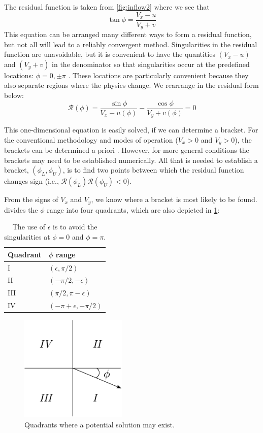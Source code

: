 \documentclass{article}
\begin{document}
The residual function is taken from \cref{fig:inflow2} where we see that
\begin{equation}
\tan\phi = \frac{V_x - u}{V_y  + v}
\end{equation}
This equation can be arranged many different ways to form a residual function, but not all will lead to a reliably convergent method. Singularities in the residual function are unavoidable, but it is convenient to have the quantities $(V_x - u)$ and $(V_y + v)$ in the denominator so that singularities occur at the predefined locations: $\phi = 0, \pm\pi$ \cite{Ning2014b}. These locations are particularly convenient because they also separate regions where the physics change.  We rearrange in the residual form below:
\begin{equation}
    \mathcal{R}(\phi) = \frac{\sin\phi}{V_x - u(\phi)} - \frac{\cos\phi}{V_y + v(\phi)} = 0
    \label{eq:residual}
\end{equation}

This one-dimensional equation is easily solved, if we can determine a bracket.  For the conventional methodology and modes of operation ($V_x > 0$ and $V_y > 0$), the brackets can be determined a priori \cite{Ning2014b}.  However, for more general conditions the brackets may need to be established numerically.  All that is needed to establish a bracket, $(\phi_L, \phi_U)$, is to find two points between which the residual function changes sign (i.e., $\mathcal{R}(\phi_L)\mathcal{R}(\phi_U) < 0$).

From the signs of $V_x$ and $V_y$, we know where a bracket is most likely to be found.   divides the $\phi$ range into four quadrants, which are also depicted in \cref{fig:quadrants}:
\begin{table}[htb]
\centering
\caption{The use of $\epsilon$ is to avoid the singularities at $\phi = 0$ and $\phi = \pi$.}
\label{tab:quadrants}
\begin{tabular}{@{}ll@{}}
\toprule
Quadrant & $\phi$ range\\
\midrule
I & $(\epsilon, \pi/2)$ \\
II & $(-\pi/2, -\epsilon)$ \\
III & $(\pi/2, \pi-\epsilon)$ \\
IV & $(-\pi+\epsilon, -\pi/2)$ \\
\bottomrule
\end{tabular}
\end{table}
\begin{figure}[htbp]
\centering
\includegraphics[width=2.0in]{figures/quadrants}
\caption{Quadrants where a potential solution may exist.}
\label{fig:quadrants}
\end{figure}
\end{document}
